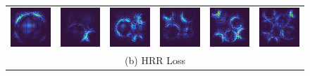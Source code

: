 \documentclass[letterpaper]{article} %
\begin{document}
\begin{figure}[!htbp]
\begin{tabular}{cccccc}
\multicolumn{1}{c}{\includegraphics[width=0.125\columnwidth]{saliency/hrr/circle/circle_1.png}} \hspace{-12pt} &  \multicolumn{1}{c}{\includegraphics[width=0.125\columnwidth]{saliency/hrr/circle/circle_2.png}} \hspace{-12pt} & \multicolumn{1}{c}{\includegraphics[width=0.125\columnwidth]{saliency/hrr/circle/circle_3.png}} \hspace{-12pt} & \multicolumn{1}{c}{\includegraphics[width=0.125\columnwidth]{saliency/hrr/circle/circle_4.png}} \hspace{-12pt} & \multicolumn{1}{c}{\includegraphics[width=0.125\columnwidth]{saliency/hrr/circle/circle_5.png}} \hspace{-12pt} & \multicolumn{1}{c}{\includegraphics[width=0.125\columnwidth]{saliency/hrr/circle/circle_6.png}} \\
\multicolumn{6}{c}{(b) HRR Loss} \\


\end{tabular}
\end{figure}
\end{document}
